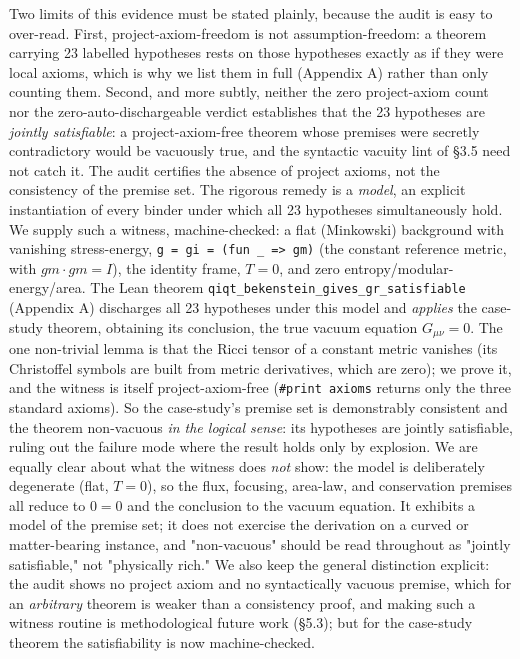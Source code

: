 \documentclass[11pt]{article}
\begin{document}
Two limits of this evidence must be stated plainly, because the audit is easy to over-read. First,
project-axiom-freedom is not assumption-freedom: a theorem carrying 23 labelled hypotheses rests on
those hypotheses exactly as if they were local axioms, which is why we list them in full (Appendix A)
rather than only counting them. Second, and more subtly, neither the zero project-axiom count nor the
zero-auto-dischargeable verdict establishes that the 23 hypotheses are \emph{jointly satisfiable}: a
project-axiom-free theorem whose premises were secretly contradictory would be vacuously true, and
the syntactic vacuity lint of §3.5 need not catch it. The audit certifies the absence of project
axioms, not the consistency of the premise set. The rigorous remedy is a \emph{model}, an explicit
instantiation of every binder under which all 23 hypotheses simultaneously hold.
We supply such a witness, machine-checked: a flat (Minkowski) background with vanishing
stress-energy, \texttt{g = gi = (fun \_ => gm)} (the constant reference metric, with $gm\cdot gm = I$), the
identity frame, $T=0$, and zero entropy/modular-energy/area. The Lean theorem
\texttt{qiqt\_bekenstein\_gives\_gr\_satisfiable} (Appendix A) discharges all 23 hypotheses under this model and
\emph{applies} the case-study theorem, obtaining its conclusion, the true vacuum equation $G_{\mu\nu}=0$.
The one non-trivial lemma is that the Ricci tensor of a constant metric vanishes (its Christoffel
symbols are built from metric derivatives, which are zero); we prove it, and the witness is itself
project-axiom-free (\texttt{\#print axioms} returns only the three standard axioms). So the case-study's
premise set is demonstrably consistent and the theorem non-vacuous \emph{in the logical sense}: its hypotheses
are jointly satisfiable, ruling out the failure mode where the result holds only by explosion. We are
equally clear about what the witness does \emph{not} show: the model is deliberately degenerate (flat,
$T=0$), so the flux, focusing, area-law, and conservation premises all reduce to $0=0$ and the
conclusion to the vacuum equation. It exhibits a model of the premise set; it does not exercise the
derivation on a curved or matter-bearing instance, and "non-vacuous" should be read throughout as
"jointly satisfiable," not "physically rich." We also keep the general distinction explicit: the
audit shows no project axiom and no syntactically vacuous premise, which for an \emph{arbitrary} theorem
is weaker than a consistency proof, and making such a witness routine is methodological future work
(§5.3); but for the case-study theorem the satisfiability is now machine-checked.
\end{document}
